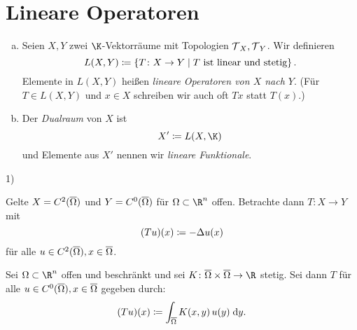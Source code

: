 \chapter{Lineare Operatoren}
\begin{thDef} \label{vl04:def3.1}\hfill
    \begin{enumerate}[(a)]
        \item \label{vl04:def3.1:linops}
            Seien $X,Y$ zwei $\K$-Vektorräume mit Topologien $\operatorname{\mathcal{T}}_X,\operatorname{\mathcal{T}}_Y$.
            Wir definieren 
            \[ L(X,Y) \defeq
                \left\{ T\colon X\to Y \Mid
                    T \text{ ist linear und stetig} 
                \right\}
            . \]
            Elemente in $L(X,Y)$ heißen \emph{lineare Operatoren von $X$ nach $Y$}.
            (Für $T\in L(X,Y)$ und $x\in X$ schreiben wir auch oft $Tx$ statt
            $T(x)$.)
            
        \item \label{vl04:def3.1:dual}
            Der \emph{Dualraum} von $X$ ist
            \[ X' \defeq L(X,\K)  \]
            und Elemente aus $X'$ nennen wir \emph{lineare Funktionale}.
    \end{enumerate}
\end{thDef}

\begin{BspList}{1)}
\item
    Gelte $X=C^2(\overline{\Omega})$ und $Y=C^0(\overline{\Omega})$ für
    $\Omega\subset\R^n$ offen. Betrachte dann $T\colon X\to Y$ mit
    \[ (Tu)(x) \coloneqq -\Delta u(x) \]
    für alle $u\in C^2(\overline{\Omega}), x\in\overline{\Omega}$.
    
\item
    Sei $\Omega\subset\R^n$ offen und beschränkt und sei
    $K\colon\setclosure\Omega\times\setclosure\Omega \to \R$ stetig.
    Sei dann $T$ für alle $u\in C^0(\overline{\Omega}), x\in\overline{\Omega}$
    gegeben durch:
    \[ (Tu)(x) \coloneqq \int_{\overline{\Omega}} K(x,y)\, u(y) \;\mathrm{d} y  . \]
\end{BspList}

